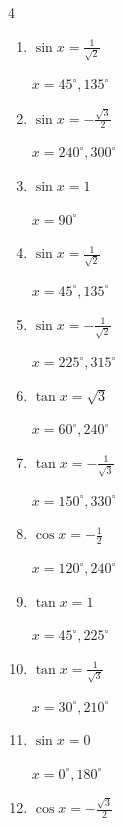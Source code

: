 \begin{multicols}{4}
\begin{enumerate}
        $\displaystyle x = 135^{\circ} , 315^{\circ}$

\columnbreak %

  \item $\displaystyle \sin{x}  = \frac{1}{\sqrt{2}}$

        $\displaystyle x = 45^{\circ} , 135^{\circ}$

  \item $\displaystyle \sin{x}  = -\frac{\sqrt{3}}{2}$

        $\displaystyle x = 240^{\circ} , 300^{\circ}$

  \item $\displaystyle \sin{x}  = 1$

        $\displaystyle x = 90^{\circ}$

  \item $\displaystyle \sin{x}  = \frac{1}{\sqrt{2}}$

        $\displaystyle x = 45^{\circ} , 135^{\circ}$

  \item $\displaystyle \sin{x}  = -\frac{1}{\sqrt{2}}$

        $\displaystyle x = 225^{\circ} , 315^{\circ}$

  \item $\displaystyle \tan{x}  = \sqrt{3}$

        $\displaystyle x = 60^{\circ} , 240^{\circ}$

  \item $\displaystyle \tan{x}  = -\frac{1}{\sqrt{3}}$

        $\displaystyle x = 150^{\circ} , 330^{\circ}$

  \item $\displaystyle \cos{x}  = -\frac{1}{2}$

        $\displaystyle x = 120^{\circ} , 240^{\circ}$

  \item $\displaystyle \tan{x}  = 1$

        $\displaystyle x = 45^{\circ} , 225^{\circ}$

  \item $\displaystyle \tan{x}  = \frac{1}{\sqrt{3}}$

        $\displaystyle x = 30^{\circ} , 210^{\circ}$

  \item $\displaystyle \sin{x}  = 0$

        $\displaystyle x = 0^{\circ} , 180^{\circ}$

  \item $\displaystyle \cos{x}  = -\frac{\sqrt{3}}{2}$


\end{enumerate}
\end{multicols}
